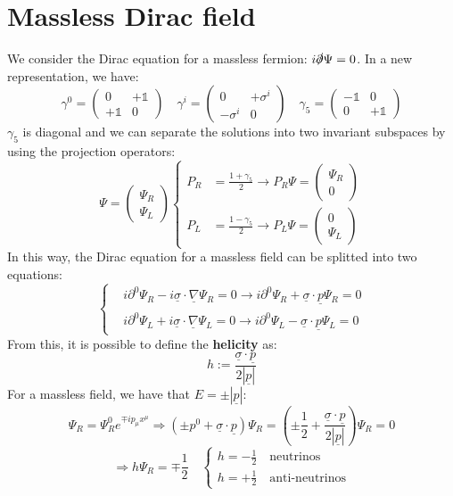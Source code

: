 \documentclass[../main.tex]{subfiles}
\begin{document}
\section{Massless Dirac field}
We consider the Dirac equation for a massless fermion: $i\slashed{\partial}\Psi=0$. In a new representation, we have:
\[
\gamma^0=\left(\begin{array}{cc}
    0 & +\mathbb{1} \\
    +\mathbb{1} & 0
\end{array}\right)
\quad 
\gamma^i=\left(\begin{array}{cc}
    0 & +\sigma^i \\
    -\sigma^i & 0
\end{array}\right)
\quad
\gamma_5=\left(\begin{array}{cc}
    -\mathbb{1} & 0 \\
    0 & +\mathbb{1}
\end{array}\right)
\]
$\gamma_5$ is diagonal and we can separate the solutions into two invariant subspaces by using the projection operators:
\[
\Psi=\left(\begin{array}{c}
\Psi_R\\
\Psi_L
\end{array}\right)
\left\{
\begin{aligned}
P_R&=\frac{1+\gamma_5}{2}\xrightarrow[]{}P_R\Psi=\left(\begin{array}{c}
\Psi_R\\
0
\end{array}\right) \\ 
P_L&=\frac{1-\gamma_5}{2}\xrightarrow[]{}P_L\Psi=\left(\begin{array}{c}
0\\
\Psi_L
\end{array}\right)
\end{aligned}
\right.
\]
In this way, the Dirac equation for a massless field can be splitted into two equations:
\[
\left\{
\begin{aligned}
&i\partial^0\Psi_R-i\underline{\sigma}\cdot\underline{\nabla}\Psi_R=0\xrightarrow[]{}i\partial^0\Psi_R+\underline{\sigma}\cdot\underline{p}\Psi_R=0\\
&i\partial^0\Psi_L+i\underline{\sigma}\cdot\underline{\nabla}\Psi_L=0\xrightarrow[]{}i\partial^0\Psi_L-\underline{\sigma}\cdot\underline{p}\Psi_L=0
\end{aligned}
\right.
\]
From this, it is possible to define the \textbf{helicity} as:
\[
h:=\frac{\underline{\sigma}\cdot\underline{p}}{2|\underline{p}|}
\]
For a massless field, we have that $E=\pm|\underline{p}|$:
\[
\Psi_R=\Psi^0_Re^{\mp ip_\mu x^\mu}\Rightarrow(\pm p^0+\underline{\sigma}\cdot\underline{p})\Psi_R=\left(\pm\frac{1}{2}+\frac{\underline{\sigma}\cdot\underline{p}}{2|\underline{p}|}\right)\Psi_R=0
\]
\[
\Rightarrow h\Psi_R=\mp\frac{1}{2}\quad\begin{cases}
h=-\frac{1}{2} \quad \text{neutrinos}\\
h=+\frac{1}{2} \quad \text{anti-neutrinos}
\end{cases}
\]
\end{document}

